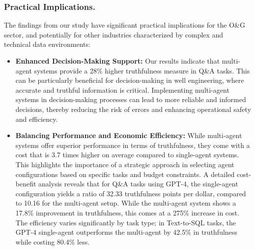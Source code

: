             
            \subsubsection{Practical Implications.} 

                The findings from our study have significant practical implications for the O\&G sector, and potentially for other industries characterized by complex and technical data environments:
                    
                \begin{itemize}
                
                    \item \textbf{Enhanced Decision-Making Support:}
                        Our results indicate that multi-agent systems provide a 28\% higher truthfulness measure in Q\&A tasks. This can be particularly beneficial for decision-making in well engineering, where accurate and truthful information is critical.
                        Implementing multi-agent systems in decision-making processes can lead to more reliable and informed decisions, thereby reducing the risk of errors and enhancing operational safety and efficiency.
                    
                    \item \textbf{Balancing Performance and Economic Efficiency:}
                        While multi-agent systems offer superior performance in terms of truthfulness, they come with a cost that is 3.7 times higher on average compared to single-agent systems.
                        This highlights the importance of a strategic approach in selecting agent configurations based on specific tasks and budget constraints. 
                        A detailed cost-benefit analysis reveals that for Q\&A tasks using GPT-4, the single-agent configuration yields a ratio of 32.33 truthfulness points per dollar, compared to 10.16 for the multi-agent setup. While the multi-agent system shows a 17.8\% improvement in truthfulness, this comes at a 275\% increase in cost. The efficiency varies significantly by task type; in Text-to-SQL tasks, the GPT-4 single-agent outperforms the multi-agent by 42.5\% in truthfulness while costing 80.4\% less. 
                        

\end{itemize}
